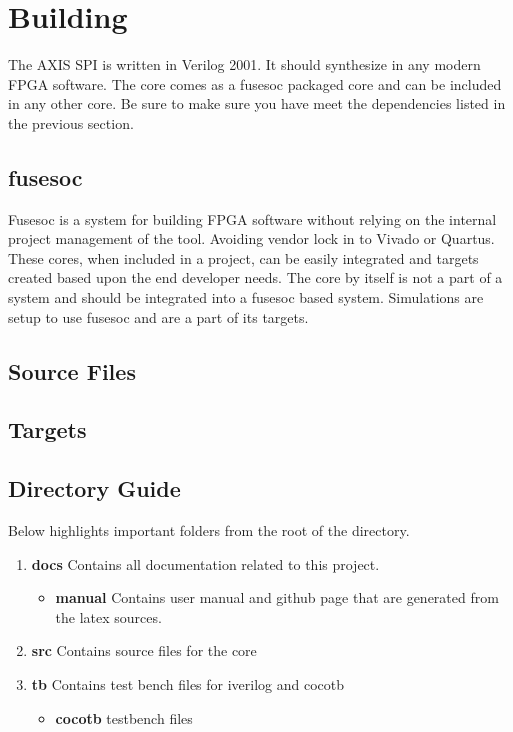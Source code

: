 \section{Building}

\par
The AXIS SPI is written in Verilog 2001. It should synthesize in any modern FPGA software. The core comes as a fusesoc packaged core and can be
included in any other core. Be sure to make sure you have meet the dependencies listed in the previous section.

\subsection{fusesoc}
\par
Fusesoc is a system for building FPGA software without relying on the internal project management of the tool. Avoiding vendor lock in to Vivado or Quartus.
These cores, when included in a project, can be easily integrated and targets created based upon the end developer needs. The core by itself is not a part of
a system and should be integrated into a fusesoc based system. Simulations are setup to use fusesoc and are a part of its targets.

\subsection{Source Files}



\subsection{Targets}



\subsection{Directory Guide}

\par
Below highlights important folders from the root of the directory.

\begin{enumerate}
  \item \textbf{docs} Contains all documentation related to this project.
    \begin{itemize}
      \item \textbf{manual} Contains user manual and github page that are generated from the latex sources.
    \end{itemize}
  \item \textbf{src} Contains source files for the core
  \item \textbf{tb} Contains test bench files for iverilog and cocotb
    \begin{itemize}
      \item \textbf{cocotb} testbench files
    \end{itemize}
\end{enumerate}

